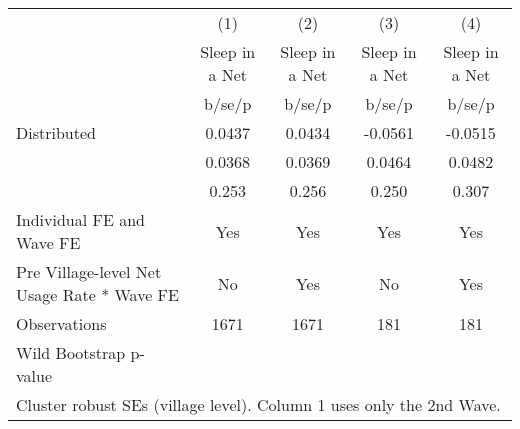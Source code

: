 {
\def\sym#1{\ifmmode^{#1}\else\(^{#1}\)\fi}
\begin{tabular}{l*{4}{c}}
\hline\hline
                    &\multicolumn{1}{c}{(1)}&\multicolumn{1}{c}{(2)}&\multicolumn{1}{c}{(3)}&\multicolumn{1}{c}{(4)}\\
                    &\multicolumn{1}{c}{Sleep in a Net}&\multicolumn{1}{c}{Sleep in a Net}&\multicolumn{1}{c}{Sleep in a Net}&\multicolumn{1}{c}{Sleep in a Net}\\
                    &      b/se/p         &      b/se/p         &      b/se/p         &      b/se/p         \\
\hline
Distributed         &      0.0437         &      0.0434         &     -0.0561         &     -0.0515         \\
                    &      0.0368         &      0.0369         &      0.0464         &      0.0482         \\
                    &       0.253         &       0.256         &       0.250         &       0.307         \\
Individual FE and Wave FE &         Yes         &         Yes         &         Yes         &         Yes         \\
Pre Village-level Net Usage Rate * Wave FE&          No         &         Yes         &          No         &         Yes         \\
\hline
Observations        &        1671         &        1671         &         181         &         181         \\
Wild Bootstrap p-value &                     &                     &                     &                     \\
\hline\hline
\multicolumn{5}{l}{\footnotesize Cluster robust SEs (village level). Column 1 uses only the 2nd Wave.}\\
\end{tabular}
}
